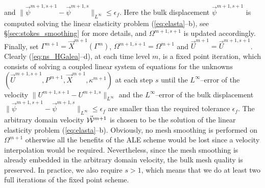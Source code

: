 and $\|\vec \psi^{m+1,s+1}-\vec \psi^{m+1,s}\|_{L^\infty} \leq\epsilon_f$.
Here the
bulk displacement $\vec \psi^{m+1,s+1}$ is computed solving the linear
elasticity problem (\ref{eq:elasta}--b), see \S\ref{sec:stokes_smoothing} for
more details, and $\Omega^{m+1,s+1}$ is updated accordingly. Finally, set
${\Gamma^{m+1} = \vec X^{m+1}(\Gamma^m)}$, $\Omega^{m+1,s+1}=\Omega^{m+1}$ and
$\vec U^{m+1}= \vec U^{m+1,s+1}$. Clearly (\ref{eq:ns_HGalea}--d), at each
time level $m$, is a fixed point iteration, which consists of solving a coupled
linear system of equations for the unknowns $(\vec U^{m+1,s+1}, P^{m+1}, \vec
X^{m+1}, \kappa^{m+1})$ at each step $s$ until the $L^\infty$--error of the
velocity $\|U^{m+1,s+1}-U^{m+1,s} \|_{L^\infty}$ and the $L^\infty$--error of
the bulk displacement $\|\vec \psi^{m+1,s+1}-\vec \psi^{m+1,s}\|_{L^\infty}
\leq\epsilon_f$ are smaller than the required tolerance $\epsilon_f$. The
arbitrary domain velocity $\vec{\mathcal W}^{m+1}$ is chosen to be the solution of the linear
elasticity problem (\ref{eq:elasta}--b). Obviously, no mesh smoothing is
performed on $\Omega^{m+1}$ otherwise all the benefits of the ALE scheme would
be lost since a velocity interpolation would be required. Nevertheless, since
the mesh smoothing is already embedded in the arbitrary domain velocity, the
bulk mesh quality is preserved. In practice, we also require $s>1$, which means
that we do at least two full iterations of the fixed point scheme.

